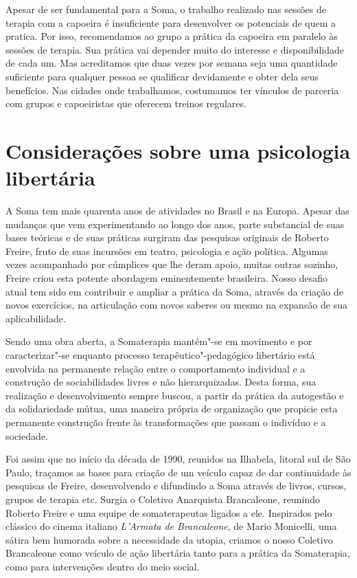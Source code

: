 Apesar de ser fundamental para a Soma, o trabalho realizado nas sessões
de terapia com a capoeira é insuficiente para desenvolver os potenciais
de quem a pratica. Por isso, recomendamos ao grupo a prática da capoeira
em paralelo às sessões de terapia. Sua prática vai depender muito do
interesse e disponibilidade de cada um. Mas acreditamos que duas vezes
por semana seja uma quantidade suficiente para qualquer pessoa se
qualificar devidamente e obter dela seus benefícios. Nas cidades onde
trabalhamos, costumamos ter vínculos de parceria com grupos e
capoeiristas que oferecem treinos regulares.

\chapter*{Considerações sobre uma psicologia libertária}

A Soma tem mais quarenta anos de atividades no Brasil e na Europa.
Apesar das mudanças que vem experimentando ao longo dos anos, parte
substancial de suas bases teóricas e de suas práticas surgiram das
pesquisas originais de Roberto Freire, fruto de suas incursões em
teatro, psicologia e ação política. Algumas vezes acompanhado por
cúmplices que lhe deram apoio, muitas outras sozinho, Freire criou esta
potente abordagem eminentemente brasileira. Nosso desafio atual tem sido
em contribuir e ampliar a prática da Soma, através da criação de novos
exercícios, na articulação com novos saberes ou mesmo na expansão de sua
aplicabilidade.

Sendo uma obra aberta, a Somaterapia mantém"-se em movimento e por
caracterizar"-se enquanto processo terapêutico"-pedagógico libertário está
envolvida na permanente relação entre o comportamento individual e a
construção de sociabilidades livres e não hierarquizadas. Desta forma,
sua realização e desenvolvimento sempre buscou, a partir da prática da
autogestão e da solidariedade mútua, uma maneira própria de organização
que propicie esta permanente construção frente às transformações que
passam o indivíduo e a sociedade.

Foi assim que no início da década de 1990, reunidos na Ilhabela, litoral
sul de São Paulo, traçamos as bases para criação de um veículo capaz de
dar continuidade às pesquisas de Freire, desenvolvendo e difundindo a
Soma através de livros, cursos, grupos de terapia etc. Surgia o Coletivo
Anarquista Brancaleone, reunindo Roberto Freire e uma equipe de
somaterapeutas ligados a ele. Inspirados pelo clássico do cinema
italiano \emph{L'Armata de Brancaleone}, de Mario Monicelli, uma sátira
bem humorada sobre a necessidade da utopia, criamos o nosso Coletivo
Brancaleone como veículo de ação libertária tanto para a prática da
Somaterapia, como para intervenções dentro do meio social.

